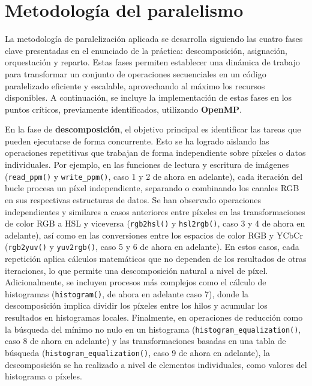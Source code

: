 \section{Metodología del paralelismo}
La metodología de paralelización aplicada se desarrolla siguiendo las cuatro fases clave presentadas en el enunciado de la práctica: descomposición, asignación, orquestación y reparto. Estas fases permiten establecer una dinámica de trabajo para transformar un conjunto de operaciones secuenciales en un código paralelizado eficiente y escalable, aprovechando al máximo los recursos disponibles. A continuación, se incluye la implementación de estas fases en los puntos críticos, previamente identificados, utilizando \textbf{OpenMP}.

En la fase de \textbf{descomposición}, el objetivo principal es identificar las tareas que pueden ejecutarse de forma concurrente. Esto se ha logrado aislando las operaciones repetitivas que trabajan de forma independiente sobre píxeles o datos individuales. Por ejemplo, en las funciones de lectura y escritura de imágenes (\texttt{read\_ppm()} y \texttt{write\_ppm()}, caso 1 y 2 de ahora en adelante), cada iteración del bucle procesa un píxel independiente, separando o combinando los canales RGB en sus respectivas estructuras de datos. Se han observado operaciones independientes y similares a casos anteriores entre píxeles en las transformaciones de color RGB a HSL y viceversa (\texttt{rgb2hsl()} y \texttt{hsl2rgb()}, caso 3 y 4 de ahora en adelante), así como en las conversiones entre los espacios de color RGB y YCbCr (\texttt{rgb2yuv()} y \texttt{yuv2rgb()}, caso 5 y 6 de ahora en adelante). En estos casos, cada repetición aplica cálculos matemáticos que no dependen de los resultados de otras iteraciones, lo que permite una descomposición natural a nivel de píxel.
Adicionalmente, se incluyen procesos más complejos como el cálculo de histogramas (\texttt{histogram()}, de ahora en adelante caso 7), donde la descomposición implica dividir los píxeles entre los hilos y acumular los resultados en histogramas locales. Finalmente, en operaciones de reducción como la búsqueda del mínimo no nulo en un histograma (\texttt{histogram\_equalization()}, caso 8 de ahora en adelante) y las transformaciones basadas en una tabla de búsqueda (\texttt{histogram\_equalization()}, caso 9 de ahora en adelante), la descomposición se ha realizado a nivel de elementos individuales, como valores del histograma o píxeles.

